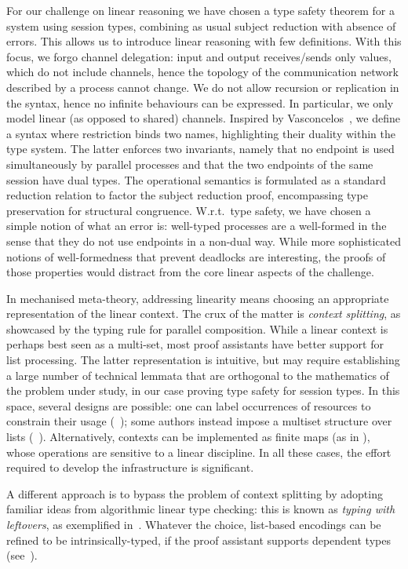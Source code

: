 \documentclass[runningheads]{llncs}
\begin{document}
For our challenge on linear reasoning we have chosen a type safety
theorem for a system using session types, combining as usual subject reduction with absence of errors.  This allows us to introduce
linear reasoning with few definitions.  With this focus, we forgo
channel delegation: input and output receives/sends only values, which
do not include channels, hence the topology of the communication
network described by a process cannot change.  We do not allow
recursion or replication in the syntax, hence no infinite behaviours
can be expressed. In particular, we only model linear (as opposed to
shared) channels. Inspired by Vasconcelos~\cite{Vasconcelos2012}, we
define a syntax where restriction binds two names, highlighting their
duality within the type system. The latter enforces
 two invariants, namely that no endpoint is used simultaneously by parallel processes and
 that the two endpoints of the same session have dual types.
The operational semantics is formulated as a standard reduction relation to factor the subject reduction proof,  encompassing type
preservation for structural congruence. W.r.t.\ type safety, we have
chosen a simple notion of what an error is: well-typed processes are a
well-formed in the sense that they do not use endpoints in a non-dual
way.  While more sophisticated notions of well-formedness that
prevent \eg deadlocks are interesting, the proofs of those properties
would distract from the core linear aspects of the challenge.

In mechanised meta-theory, addressing linearity means choosing an
appropriate representation of the linear context.  The crux of the
matter is \emph{context splitting}, as showcased by the typing rule
for parallel composition.  While a linear context is perhaps best seen
as a multi-set, most proof assistants have better support for list
processing.  The latter representation is intuitive, but may require
establishing a large number of technical lemmata that are orthogonal
to the mathematics of the problem under study, in our case proving
type safety for session types.  In this space, several designs are
possible: one can label occurrences of resources to constrain their
usage (\eg~\cite{CicconeP20}); some authors instead impose a multiset
structure over lists
(\eg~\cite{Danielsson12,ChaudhuriLR19}). Alternatively, contexts can
be implemented as finite maps (as in \cite{Castro2020}), whose operations
are sensitive to a linear discipline. In all these cases, the effort
required to develop the infrastructure is significant.

A different approach is to bypass the problem of context splitting by adopting familiar ideas from algorithmic linear type checking: this is known as \emph{typing with leftovers}, as exemplified in~\cite{DBLP:conf/forte/ZalakainD21}.
Whatever the choice, list-based encodings can be refined to be intrinsically-typed, if the proof assistant supports dependent types (see~\cite{Thiemann2019,CicconeP20,RouvoetPKV20}).
\end{document}
